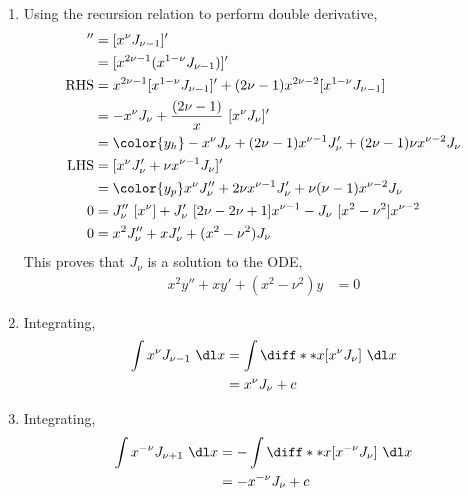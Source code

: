 \begin{enumerate}
    \item Using the recursion relation to perform double derivative,
          \begin{align}
              [x^\nu J_\nu]'' & = [x^{\nu}J_{\nu-1}]'                                 \\
                              & = [x^{2\nu-1}(x^{1-\nu}J_{\nu-1})]'                   \\
              \text{RHS}      & =  x^{2\nu-1} [x^{1-\nu}J_{\nu-1}]'
              + (2\nu-1)x^{2\nu-2}[x^{1-\nu}J_{\nu-1}]                                \\
                              & = -x^{\nu}J_\nu + \frac{(2\nu-1)}{x}\ [x^{\nu}J_\nu]' \\
                              & = \color{y_h} -x^{\nu}J_\nu +
              (2\nu-1)x^{\nu-1}J_\nu' + (2\nu-1)\nu x^{\nu-2} J_\nu                   \\
              \text{LHS}      & = [x^{\nu}J_\nu' + \nu x^{\nu-1}J_\nu]'               \\
                              & = \color{y_p} x^{\nu} J_\nu '' + 2\nu x^{\nu-1}J_\nu'
              + \nu(\nu-1) x^{\nu-2}J_\nu                                             \\
              0               & = J_\nu'' \ [x^\nu]
              + J_\nu'\ [2\nu - 2\nu + 1]x^{\nu-1}
              - J_\nu \ [x^2 - \nu^2]x^{\nu-2}                                        \\
              0               & = x^2 J_\nu'' + x J_\nu ' + (x^2 - \nu^2) J_\nu
          \end{align}
          This proves that $ J_\nu $ is a solution to the ODE,
          \begin{align}
              x^2y'' + xy' + (x^2 - \nu^2)y & = 0
          \end{align}

    \item Integrating,
          \begin{align}
              \int x^\nu J_{\nu-1}\ \dl x & = \int \diff**{x}{[x^{\nu}J_{\nu}]}\ \dl x \\
                                          & = x^{\nu} J_{\nu} + c
          \end{align}

    \item Integrating,
          \begin{align}
              \int x^{-\nu} J_{\nu+1}\ \dl x &
              = -\int \diff**{x}{[x^{-\nu}J_{\nu}]}\ \dl x             \\
                                             & = -x^{-\nu} J_{\nu} + c
          \end{align}


\end{enumerate}
